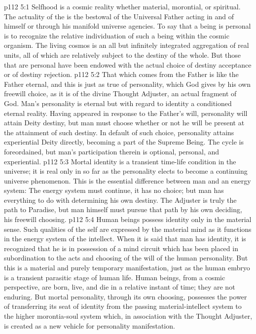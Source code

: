 \vs p112 5:1 Selfhood is a cosmic reality whether material, morontial, or spiritual. The actuality of the  is the bestowal of the Universal Father acting in and of himself or through his manifold universe agencies. To say that a being is personal is to recognize the relative individuation of such a being within the cosmic organism. The living cosmos is an all but infinitely integrated aggregation of real units, all of which are relatively subject to the destiny of the whole. But those that are personal have been endowed with the actual choice of destiny acceptance or of destiny rejection.
\vs p112 5:2 That which comes from the Father is like the Father eternal, and this is just as true of personality, which God gives by his own freewill choice, as it is of the divine Thought Adjuster, an actual fragment of God. Man’s personality is eternal but with regard to identity a conditioned eternal reality. Having appeared in response to the Father’s will, personality will attain Deity destiny, but man must choose whether or not he will be present at the attainment of such destiny. In default of such choice, personality attains experiential Deity directly, becoming a part of the Supreme Being. The cycle is foreordained, but man’s participation therein is optional, personal, and experiential.
\pc \vs p112 5:3 Mortal identity is a transient time\hyp{}life condition in the universe; it is real only in so far as the personality elects to become a continuing universe phenomenon. This is the essential difference between man and an energy system: The energy system must continue, it has no choice; but man has everything to do with determining his own destiny. The Adjuster is truly the path to Paradise, but man himself must pursue that path by his own deciding, his freewill choosing.
\vs p112 5:4 Human beings possess identity only in the material sense. Such qualities of the self are expressed by the material mind as it functions in the energy system of the intellect. When it is said that man has identity, it is recognized that he is in possession of a mind circuit which has been placed in subordination to the acts and choosing of the will of the human personality. But this is a material and purely temporary manifestation, just as the human embryo is a transient parasitic stage of human life. Human beings, from a cosmic perspective, are born, live, and die in a relative instant of time; they are not enduring. But mortal personality, through its own choosing, possesses the power of transferring its seat of identity from the passing material\hyp{}intellect system to the higher morontia\hyp{}soul system which, in association with the Thought Adjuster, is created as a new vehicle for personality manifestation.
